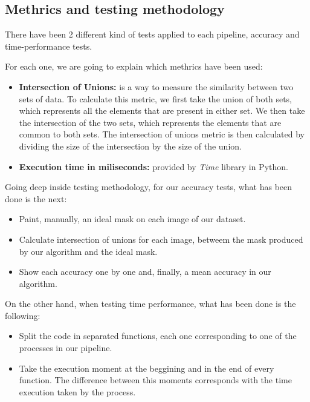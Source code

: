 \documentclass[12pt, a4paper]{article}
\begin{document}
\subsection{Methrics and testing methodology}

There have been 2 different kind of tests applied to each pipeline, accuracy and time-performance tests. 

For each one, we are going to explain which methrics have been used: 

\begin{itemize}
    \item \textbf{Intersection of Unions:} is a way to measure the similarity between two sets of data. 
    To calculate this metric, we first take the union of both sets, 
    which represents all the elements that are present in either set. 
    We then take the intersection of the two sets, which represents the elements that 
    are common to both sets. The intersection of unions metric is 
    then calculated by dividing the size of the intersection by the size of the union. 


    \item \textbf{Execution time in miliseconds:} provided by \textit{Time} library in Python. 
\end{itemize}

Going deep inside testing methodology, for our accuracy tests, what has been done is the next: 

\begin{itemize}
    \item Paint, manually, an ideal mask on each image of our dataset.
    \item Calculate intersection of unions for each image, betweem 
    the mask produced by our algorithm and the ideal mask. 
    \item Show each accuracy one by one and, finally, a mean accuracy in our algorithm. 
\end{itemize}


On the other hand, when testing time performance, what has been done is the following: 

\begin{itemize}
    \item Split the code in separated functions, each one corresponding to one of the processes in our
        pipeline. 
    \item Take the execution moment at the beggining and in the end of every function. The difference between
    this moments corresponds with the time execution taken by the process. 
\end{itemize}
\end{document}
